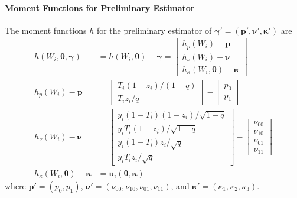 \documentclass[12pt]{article}
\begin{document}
\paragraph{Moment Functions for Preliminary Estimator}
The moment functions $h$ for the preliminary estimator of $\boldsymbol{\gamma}' = (\mathbf{p}', \boldsymbol{\nu}', \boldsymbol{\kappa}')$ are
\begin{align*}
  h(W_i, \boldsymbol{\theta}, \boldsymbol{\gamma}) &= h(W_i,\boldsymbol{\theta}) - \boldsymbol{\gamma} =  \left[
  \begin{array}{l}
    h_p(W_i) - \mathbf{p}\\
    h_\nu(W_i) - \boldsymbol{\nu}\\
    h_\kappa(W_i,\boldsymbol{\theta}) - \boldsymbol{\kappa}
  \end{array}
\right]\\
h_p(W_i) - \mathbf{p} &= \left[
\begin{array}{l}
  T_i (1-z_i)/(1-q)\\ 
  T_i z_i / q 
\end{array}
\right] - \left[
\begin{array}{c}
  p_0 \\ p_1
\end{array}
\right]\\
h_\nu(W_i) - \boldsymbol{\nu} &= \left[
\begin{array}{l}
  y_i (1 - T_i) (1-z_i) / \sqrt{1-q}\\ 
  y_i T_i (1-z_i) / \sqrt{1-q} \\
  y_i (1 - T_i) z_i / \sqrt{q} \\
  y_i T_i z_i/\sqrt{q} 
\end{array}
\right] - \left[
\begin{array}{c}
  \nu_{00} \\
  \nu_{10} \\
  \nu_{01} \\
  \nu_{11} 
\end{array}
\right]\\
h_\kappa(W_i, \boldsymbol{\theta}) - \boldsymbol{\kappa} &= \mathbf{u}_i(\boldsymbol{\theta}, \boldsymbol{\kappa})
\end{align*}
where $\mathbf{p}'= (p_0, p_1)$, $\boldsymbol{\nu}' = (\nu_{00}, \nu_{10}, \nu_{01}, \nu_{11})$, and $\boldsymbol{\kappa'} = (\kappa_1, \kappa_2, \kappa_3)$.
\end{document}

